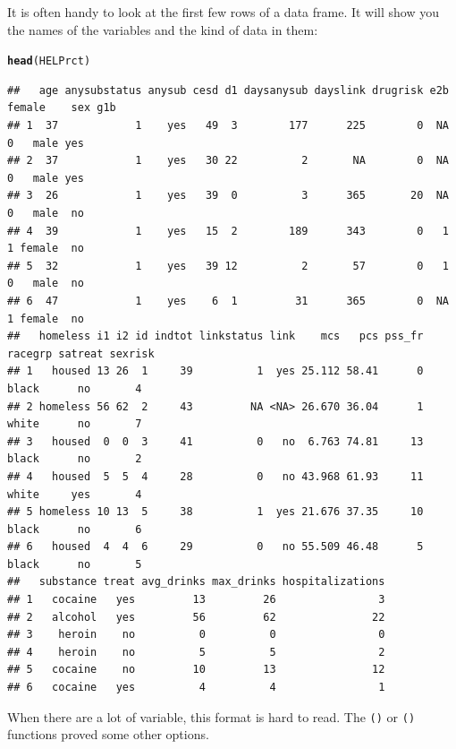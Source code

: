 \documentclass[twoside]{book}\usepackage[]{graphicx}\usepackage[]{xcolor}
\makeatletter
\newcommand{\hlstd}[1]{\textcolor[rgb]{0.345,0.345,0.345}{#1}}%
\newcommand{\hlkwd}[1]{\textcolor[rgb]{0.737,0.353,0.396}{\textbf{#1}}}%
\newenvironment{kframe}{%
 \def\at@end@of@kframe{}%
 \ifinner\ifhmode%
  \def\at@end@of@kframe{\end{minipage}}%
  \begin{minipage}{\columnwidth}%
 \fi\fi%
 \def\FrameCommand##1{\hskip\@totalleftmargin \hskip-\fboxsep
 \colorbox{shadecolor}{##1}\hskip-\fboxsep
     \hskip-\linewidth \hskip-\@totalleftmargin \hskip\columnwidth}%
 \MakeFramed {\advance\hsize-\width
   \@totalleftmargin\z@ \linewidth\hsize
   \@setminipage}}%
 {\par\unskip\endMakeFramed%
 \at@end@of@kframe}
\newenvironment{knitrout}{}{} %
\newcommand{\Rindex}[1]{\index{\texttt{#1}}}
\newcommand{\function}[1]{{\color{purple!75!blue}\texttt{\StrSubstitute{#1}{()}{}()}}\Rindex{#1}}
\makeatother
\begin{document}
It is often handy to look at the first few rows of a data frame.  It will
show you the names of the variables and the kind of data in them:
\begin{knitrout}
\color{fgcolor}\begin{kframe}
\begin{alltt}
\hlkwd{head}\hlstd{(HELPrct)}
\end{alltt}
\begin{verbatim}
##   age anysubstatus anysub cesd d1 daysanysub dayslink drugrisk e2b female    sex g1b
## 1  37            1    yes   49  3        177      225        0  NA      0   male yes
## 2  37            1    yes   30 22          2       NA        0  NA      0   male yes
## 3  26            1    yes   39  0          3      365       20  NA      0   male  no
## 4  39            1    yes   15  2        189      343        0   1      1 female  no
## 5  32            1    yes   39 12          2       57        0   1      0   male  no
## 6  47            1    yes    6  1         31      365        0  NA      1 female  no
##   homeless i1 i2 id indtot linkstatus link    mcs   pcs pss_fr racegrp satreat sexrisk
## 1   housed 13 26  1     39          1  yes 25.112 58.41      0   black      no       4
## 2 homeless 56 62  2     43         NA <NA> 26.670 36.04      1   white      no       7
## 3   housed  0  0  3     41          0   no  6.763 74.81     13   black      no       2
## 4   housed  5  5  4     28          0   no 43.968 61.93     11   white     yes       4
## 5 homeless 10 13  5     38          1  yes 21.676 37.35     10   black      no       6
## 6   housed  4  4  6     29          0   no 55.509 46.48      5   black      no       5
##   substance treat avg_drinks max_drinks hospitalizations
## 1   cocaine   yes         13         26                3
## 2   alcohol   yes         56         62               22
## 3    heroin    no          0          0                0
## 4    heroin    no          5          5                2
## 5   cocaine    no         10         13               12
## 6   cocaine   yes          4          4                1
\end{verbatim}
\end{kframe}
\end{knitrout}

When there are a lot of variable, this format is hard to read.  The \function{glimps()} or \function{inspect()}
functions proved some other options.
\end{document}
